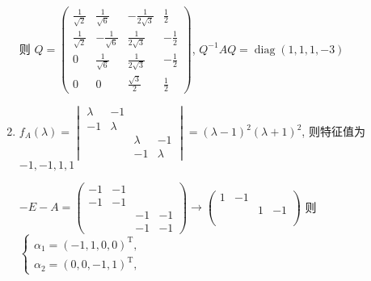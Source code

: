 \begin{enumerate}
			       则 \( Q = \begin{pmatrix}
				       \frac{1}{\sqrt{2}} & \frac{1}{\sqrt{6}}  & -\frac{1}{2\sqrt{3}} & \frac{1}{2}  \\
				       \frac{1}{\sqrt{2}} & -\frac{1}{\sqrt{6}} & \frac{1}{2\sqrt{3}}  & -\frac{1}{2} \\
				       0                  & \frac{1}{\sqrt{6}}  & \frac{1}{2\sqrt{3}}  & -\frac{1}{2} \\
				       0                  & 0                   & \frac{\sqrt{3}}{2}   & \frac{1}{2}
			       \end{pmatrix} \), \( Q^{-1}AQ = \operatorname{diag}(1, 1, 1, -3) \)
			 \item %
			       \( f_{A}(\lambda) = \begin{vmatrix}
				       \lambda & -1      &         &         \\
				       -1      & \lambda &         &         \\
				               &         & \lambda & -1      \\
				               &         & -1      & \lambda
			       \end{vmatrix} = (\lambda-1)^{2}(\lambda+1)^{2} \), 则特征值为 \( -1, -1, 1, 1 \)

			       \( -E-A = \begin{pmatrix}
				       -1 & -1 &    &    \\
				       -1 & -1 &    &    \\
				          &    & -1 & -1 \\
				          &    & -1 & -1
			       \end{pmatrix} \rightarrow \begin{pmatrix}
				       1 & -1 &   &    \\
				         &    & 1 & -1 \\
				         &    &   &    \\
				         &    &   &
			       \end{pmatrix} \) 则 \( \begin{cases} \alpha_{1} = (-1, 1, 0, 0)^{\mathrm{T}}, \\ \alpha_{2} = (0, 0, -1, 1)^{\mathrm{T}}, \end{cases} \)


\end{enumerate}
